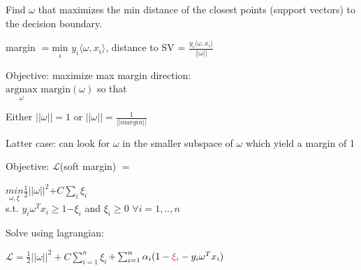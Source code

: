 \begin{center}
\end{center}

Find $\omega$ that maximizes the min distance of the closest points (support vectors) to the decision boundary.

margin $ = \underset{i}{\text{min}}$ $y_i\langle\omega, x_i\rangle$, distance to SV = $\frac{y_i\langle\omega, x_i\rangle}{||\omega||}$

Objective: maximize max margin direction: \\
$\underset{\omega}{\text{argmax}}$ $ \text{margin}(\omega)$ so that

Either  $||\omega|| = 1$ or $||\omega|| = \frac{1}{||margin||}$

Latter case: can look for $\omega$ in the smaller subspace of $\omega$ which yield a margin of 1

Objective: $\mathcal{L}$\color{red}(soft margin) \color{black} $=$
\begin{center}
    $\underset{\omega, \xi}{min}\frac{1}{2}||\omega||^2$\color{red}$ + C\sum_i\xi_i$\color{black}\\
    s.t. $y_i\omega^Tx_i \geq 1$\color{red}$- \xi_i$ and $\xi_i \geq 0$ \color{black} $\forall i = 1,..,n$ 
\end{center}


Solve using lagrangian: 
\begin{center}
    $\mathcal{L} = \frac{1}{2}||\omega||^2 +$\color{red}$ C\sum_{i=1}^n\xi_i$\color{black}$ + \sum_{i=1}^n \alpha_i(1-\color{red}\xi_i \color{black} - y_i\omega^Tx_i)$
\end{center}
